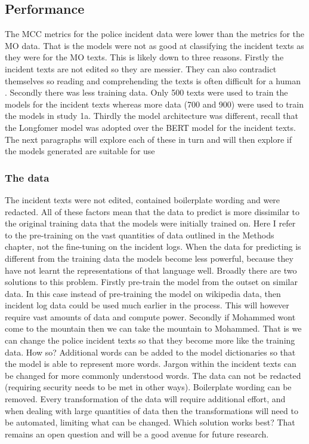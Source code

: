 \subsection{Performance} The MCC metrics for the police incident data were lower than the metrics for the MO data. That is the models were not as good at classifying the incident texts as they were for the MO texts. This is likely down to three reasons. Firstly the incident texts are not edited so they are messier. They can also contradict themselves so reading and comprehending the texts is often difficult for a human . Secondly there was less training data. Only 500 texts were used to train the models for the incident texts whereas more data (700 and 900) were used to train the models in study 1a. Thirdly the model architecture was different, recall that the Longfomer model was adopted over the BERT model for the incident texts. The next paragraphs will explore each of these in turn and will then explore if the models generated are suitable for use

\subsubsection{The data} The incident texts were not edited, contained boilerplate wording and were redacted. All of these factors mean that the data to predict is more dissimilar to the original training data that the models were initially trained on. Here I refer to the pre-training on the vast quantities of data outlined in the Methods chapter, not the fine-tuning on the incident logs. When the data for predicting is different from the training data the models become less powerful, because they have not learnt the representations of that language well. Broadly there are two solutions to this problem. Firstly pre-train the model from the outset on similar data. In this case instead of pre-training the model on wikipedia data, then incident log data could be used much earlier in the process. This will however require vast amounts of data and compute power. Secondly if Mohammed wont come to the mountain then we can take the mountain to Mohammed.  That is we can change the police incident texts so that they become more like the training data. How so? Additional words can be added to the model dictionaries so that the model is able to represent more words. Jargon within the incident texts can be changed for more commonly understood words. The data can not be redacted (requiring security needs to be met in other ways). Boilerplate wording can be removed.  Every transformation of the data  will require additional effort, and when dealing with large quantities of data then the transformations will need to be automated, limiting what can be changed. Which solution works best? That remains an open question and will be a good avenue for future research.   

